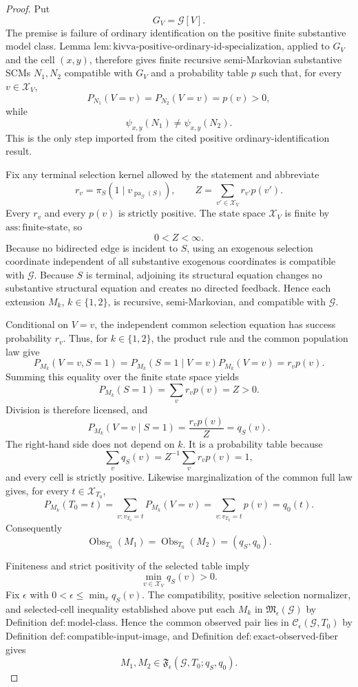 \documentclass{article}
\begin{document}
\begin{proof}
Put
\[
 G_V=\mathcal G[V].
\]
The premise is failure of ordinary identification on the positive finite substantive model class. Lemma \(\mathrm{lem{:}kivva\text{-}positive\text{-}ordinary\text{-}id\text{-}specialization}\), applied to \(G_V\) and the cell \((x,y)\), therefore gives finite recursive semi-Markovian substantive SCMs \(N_1,N_2\) compatible with \(G_V\) and a probability table \(p\) such that, for every \(v\in\mathcal X_V\),
\[
 P_{N_1}(V=v)=P_{N_2}(V=v)=p(v)>0,
\]
while
\[
 \psi_{x,y}(N_1)\ne\psi_{x,y}(N_2).
\]
This is the only step imported from the cited positive ordinary-identification result.

Fix any terminal selection kernel allowed by the statement and abbreviate
\[
 r_v=\pi_S(1\mid v_{\operatorname{pa}_{\mathcal G}(S)}),
 \qquad
 Z=\sum_{v'\in\mathcal X_V}r_{v'}p(v').
\]
Every \(r_v\) and every \(p(v)\) is strictly positive. The state space \(\mathcal X_V\) is finite by \(\mathrm{ass{:}finite\text{-}state}\), so
\[
 0<Z<\infty.
\]
Because no bidirected edge is incident to \(S\), using an exogenous selection coordinate independent of all substantive exogenous coordinates is compatible with \(\mathcal G\). Because \(S\) is terminal, adjoining its structural equation changes no substantive structural equation and creates no directed feedback. Hence each extension \(M_k\), \(k\in\{1,2\}\), is recursive, semi-Markovian, and compatible with \(\mathcal G\).

Conditional on \(V=v\), the independent common selection equation has success probability \(r_v\). Thus, for \(k\in\{1,2\}\), the product rule and the common population law give
\[
 P_{M_k}(V=v,S=1)
 =P_{M_k}(S=1\mid V=v)P_{M_k}(V=v)
 =r_vp(v).
\]
Summing this equality over the finite state space yields
\[
 P_{M_k}(S=1)=\sum_v r_vp(v)=Z>0.
\]
Division is therefore licensed, and
\[
 P_{M_k}(V=v\mid S=1)
 =\frac{r_vp(v)}{Z}
 =q_S(v).
\]
The right-hand side does not depend on \(k\). It is a probability table because
\[
 \sum_vq_S(v)=Z^{-1}\sum_vr_vp(v)=1,
\]
and every cell is strictly positive. Likewise marginalization of the common full law gives, for every \(t\in\mathcal X_{T_0}\),
\[
 P_{M_k}(T_0=t)
 =\sum_{v:v_{T_0}=t}P_{M_k}(V=v)
 =\sum_{v:v_{T_0}=t}p(v)
 =q_0(t).
\]
Consequently
\[
 \operatorname{Obs}_{T_0}(M_1)
 =\operatorname{Obs}_{T_0}(M_2)
 =(q_S,q_0).
\]

Finiteness and strict positivity of the selected table imply
\[
 \min_{v\in\mathcal X_V}q_S(v)>0.
\]
Fix \(\epsilon\) with \(0<\epsilon\leq\min_vq_S(v)\). The compatibility, positive selection normalizer, and selected-cell inequality established above put each \(M_k\) in \(\mathfrak M_\epsilon(\mathcal G)\) by Definition \(\mathrm{def{:}model\text{-}class}\). Hence the common observed pair lies in \(\mathcal C_\epsilon(\mathcal G,T_0)\) by Definition \(\mathrm{def{:}compatible\text{-}input\text{-}image}\), and Definition \(\mathrm{def{:}exact\text{-}observed\text{-}fiber}\) gives
\[
 M_1,M_2\in\mathfrak F_\epsilon(\mathcal G,T_0;q_S,q_0).
\]


\end{proof}
\end{document}
